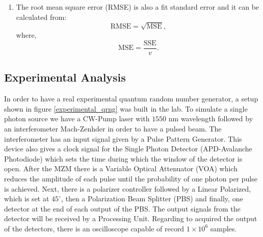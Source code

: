 \begin{enumerate}
  \item The root mean square error (RMSE) is also a fit standard error and it can be calculated from:
    \begin{equation}\label{}
      \textrm{RMSE} = \sqrt{\textrm{MSE}},
      \nonumber
    \end{equation}
    where,
    \begin{equation}\label{}
      \textrm{MSE} = \frac{\textrm{SSE}}{v}.
      \nonumber
    \end{equation}

\end{enumerate}

\subsection{Experimental Analysis}

In order to have a real experimental quantum random number generator, a setup shown in figure \ref{experimental_qrng} was built in the lab. To simulate a single photon source we have a CW-Pump laser with $1550$ nm wavelength followed by an interferometer Mach-Zenhder in order to have a pulsed beam. The interferometer has an input signal given by a Pulse Pattern Generator. This device also gives a clock signal for the Single Photon Detector (APD-Avalanche Photodiode) which sets the time during which the window of the detector is open. After the MZM there is a Variable Optical Attenuator (VOA) which reduces the amplitude of each pulse until the probability of one photon per pulse is achieved. Next, there is a polarizer controller followed by a Linear Polarized, which is set at $45^{\circ}$, then a Polarization Beam Splitter (PBS) and finally, one detector at the end of each output of the PBS. The output signals from the detector will be received by a Processing Unit. Regarding to acquired the output of the detectors, there is an oscilloscope capable of record $1 \times 10^{6}$ samples.




